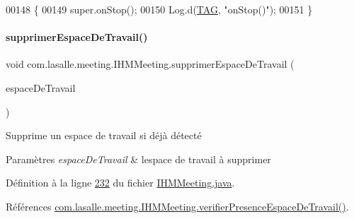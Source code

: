 \begin{DoxyCode}
00148     \{
00149         super.onStop();
00150         Log.d(\hyperlink{classcom_1_1lasalle_1_1meeting_1_1_i_h_m_meeting_a239eafcb0ccc896bdba538d1c0f08e65}{TAG}, \textcolor{stringliteral}{"onStop()"});
00151     \}
\end{DoxyCode}
\mbox{\label{classcom_1_1lasalle_1_1meeting_1_1_i_h_m_meeting_a1418ee16ded8b09f4c4a9c1a9359163a}} 
\paragraph{\texorpdfstring{supprimer\+Espace\+De\+Travail()}{supprimerEspaceDeTravail()}}
{\footnotesize\ttfamily void com.\+lasalle.\+meeting.\+I\+H\+M\+Meeting.\+supprimer\+Espace\+De\+Travail (\begin{DoxyParamCaption}\item[{\hyperlink{classcom_1_1lasalle_1_1meeting_1_1_espace_de_travail}{Espace\+De\+Travail}}]{espace\+De\+Travail }\end{DoxyParamCaption})\hspace{0.3cm}{\ttfamily [private]}}



Supprime un espace de travail si déjà détecté 


\begin{DoxyParams}{Paramètres}
{\em espace\+De\+Travail} & l\textquotesingle{}espace de travail à supprimer \\
\hline
\end{DoxyParams}


Définition à la ligne \hyperlink{_i_h_m_meeting_8java_source_l00232}{232} du fichier \hyperlink{_i_h_m_meeting_8java_source}{I\+H\+M\+Meeting.\+java}.



Références \hyperlink{_i_h_m_meeting_8java_source_l00248}{com.\+lasalle.\+meeting.\+I\+H\+M\+Meeting.\+verifier\+Presence\+Espace\+De\+Travail()}.


